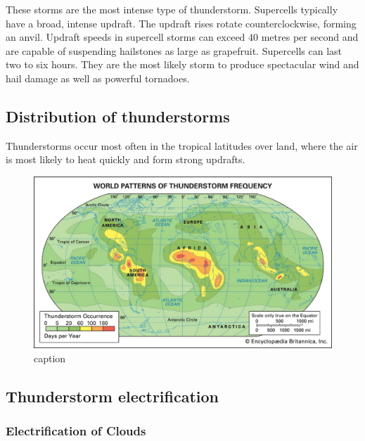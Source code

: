 \documentclass[12pt,oneside]{book}
\begin{document}
These storms are the most intense type of thunderstorm. Supercells
typically have a broad, intense updraft. The updraft rises rotate
counterclockwise, forming an anvil. Updraft speeds in supercell storms
can exceed 40 metres per second and are capable of suspending hailstones
as large as grapefruit. Supercells can last two to six hours. They are
the most likely storm to produce spectacular wind and hail damage as
well as powerful tornadoes.

\subsection{Distribution of
thunderstorms}\label{distribution-of-thunderstorms}

Thunderstorms occur most often in the tropical latitudes over land,
where the air is most likely to heat quickly and form strong updrafts.

\begin{figure}

{\centering \includegraphics[width=0.8\linewidth]{figures/FigureE5} 

}

\caption{caption}\label{fig:Distributionthunderstorms}
\end{figure}

\subsection{Thunderstorm
electrification}\label{thunderstorm-electrification}

\subsubsection{Electrification of
Clouds}\label{electrification-of-clouds}
\end{document}
